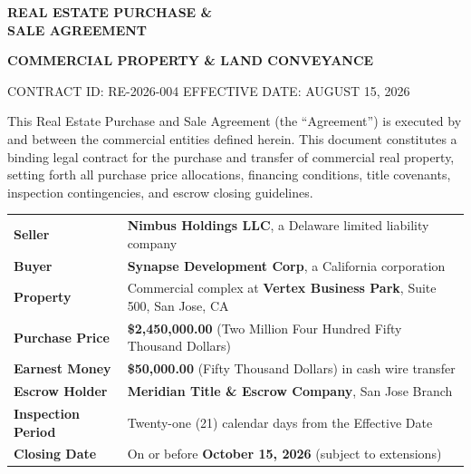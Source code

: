 \thispagestyle{plain}

\begin{tcolorbox}[
    enhanced,
    colback=lawnavy,
    colframe=lawnavy,
    arc=0mm,
    top=30pt,
    bottom=30pt,
    left=25pt,
    right=25pt,
    boxrule=0pt,
    borderline west={6pt}{0pt}{lawgold}
]
    {\color{white}\Huge\bfseries\sffamily REAL ESTATE PURCHASE \&\\ SALE AGREEMENT\par}
    \vspace{10pt}
    {\color{lawgold}\large\bfseries COMMERCIAL PROPERTY \& LAND CONVEYANCE\par}
    \vspace{15pt}
    {\color{white}\footnotesize\sffamily CONTRACT ID: RE-2026-004 \hfill EFFECTIVE DATE: AUGUST 15, 2026}
\end{tcolorbox}

\vspace{25pt}

\noindent
This Real Estate Purchase and Sale Agreement (the ``Agreement'') is executed by and between the commercial entities defined herein. This document constitutes a binding legal contract for the purchase and transfer of commercial real property, setting forth all purchase price allocations, financing conditions, title covenants, inspection contingencies, and escrow closing guidelines.

\vspace{20pt}

\begin{tcolorbox}[
    enhanced,
    colback=lawbg,
    colframe=lawteal,
    arc=0mm,
    boxrule=1pt,
    title={\sffamily\bfseries\color{white} TRANSACTION SUMMARY REFERENCE},
    toptitle=8pt,
    bottomtitle=8pt,
    left=15pt,
    right=15pt,
    top=12pt,
    bottom=12pt
]
\renewcommand{\arraystretch}{1.4}
\begin{tabularx}{\textwidth}{@{} >{\bfseries\color{lawnavy}}l X @{}}
    Seller & \textbf{Nimbus Holdings LLC}, a Delaware limited liability company \\
    Buyer & \textbf{Synapse Development Corp}, a California corporation \\
    Property & Commercial complex at \textbf{Vertex Business Park}, Suite 500, San Jose, CA \\
    Purchase Price & \textbf{\$2,450,000.00} (Two Million Four Hundred Fifty Thousand Dollars) \\
    Earnest Money & \textbf{\$50,000.00} (Fifty Thousand Dollars) in cash wire transfer \\
    Escrow Holder & \textbf{Meridian Title \& Escrow Company}, San Jose Branch \\
    Inspection Period & Twenty-one (21) calendar days from the Effective Date \\
    Closing Date & On or before \textbf{October 15, 2026} (subject to extensions)
\end{tabularx}
\end{tcolorbox}

